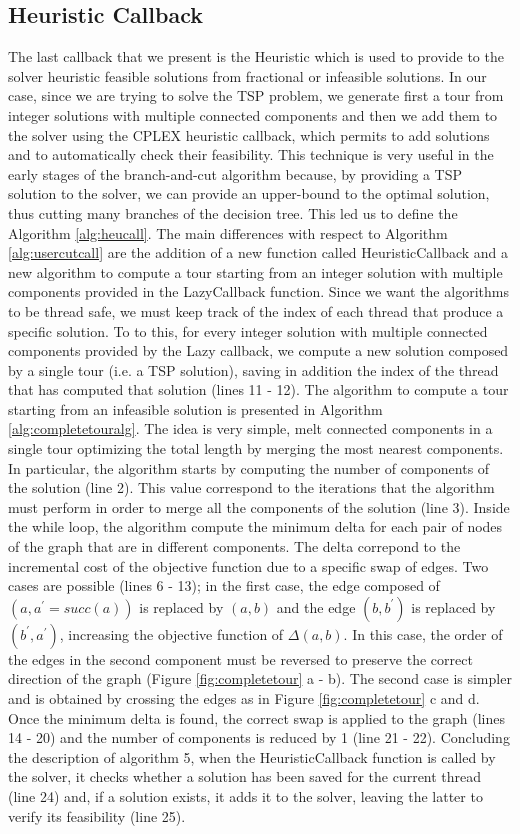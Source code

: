 \subsection{Heuristic Callback}
The last callback that we present is the Heuristic which is used to provide to the solver heuristic feasible solutions from fractional or infeasible solutions. 
In our case, since we are trying to solve the TSP problem, we generate first a tour from integer solutions with multiple connected components and then we add them to the solver using the CPLEX heuristic callback, which permits to add solutions and to automatically check their feasibility. This technique is very useful in the early stages of the branch-and-cut algorithm because, by providing a TSP solution to the solver, we can provide an upper-bound to the optimal solution, thus cutting many branches of the decision tree. This led us to define the Algorithm \ref{alg:heucall}. The main differences with respect to Algorithm \ref{alg:usercutcall} are the addition of a new function called HeuristicCallback and a new algorithm to compute a tour starting from an integer solution with multiple components provided in the LazyCallback function. Since we want the algorithms to be thread safe, we must keep track of the index of each thread that produce a specific solution. To to this, for every integer solution with multiple connected components provided by the Lazy callback, we compute a new solution composed by a single tour (i.e. a TSP solution), saving in addition the index of the thread that has computed that solution (lines 11 - 12).
The algorithm to compute a tour starting from an infeasible solution is presented in Algorithm \ref{alg:completetouralg}. The idea is very simple, melt connected components in a single tour optimizing the total length by merging the most nearest components.
In particular, the algorithm starts by computing the number of components of the solution (line 2). This value correspond to the iterations that the algorithm must perform in order to merge all the components of the solution (line 3). Inside the while loop, the algorithm compute the minimum delta for each pair of nodes of the graph that are in different components. The delta correpond to the incremental cost of the objective function due to a specific swap of edges. Two cases are possible (lines 6 - 13); in the first case, the edge composed of $(a, a^{\prime} = \textit{succ}(a))$ is replaced by $(a, b)$ and the edge $(b, b^{\prime})$ is replaced by $(b^{\prime}, a^{\prime})$, increasing the objective function of $\Delta(a,b)$. In this case, the order of the edges in the second component must be reversed to preserve the correct direction of the graph (Figure \ref{fig:completetour} a - b). The second case is simpler and is obtained by crossing the edges as in Figure \ref{fig:completetour} c and d. Once the minimum delta is found, the correct swap is applied to the graph (lines 14 - 20) and the number of components is reduced by 1 (line 21 - 22). 
Concluding the description of algorithm 5, when the HeuristicCallback function is called by the solver, it checks whether a solution has been saved for the current thread (line 24) and, if a solution exists, it adds it to the solver, leaving the latter to verify its feasibility (line 25).

